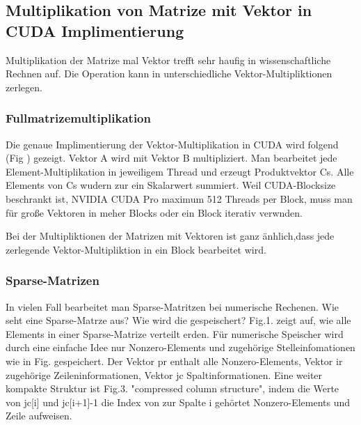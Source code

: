 



\subsection{Multiplikation von Matrize mit Vektor in CUDA Implimentierung}
Multiplikation der Matrize mal Vektor trefft sehr haufig in wissenschaftliche Rechnen auf. Die Operation kann in unterschiedliche Vektor-Multipliktionen zerlegen.

\subsubsection{Fullmatrizemultiplikation}

Die genaue Implimentierung der Vektor-Multiplikation in CUDA wird folgend (Fig ) 
gezeigt. Vektor A wird mit Vektor B multipliziert. 
Man bearbeitet jede Element-Multiplikation in jeweiligem Thread und erzeugt Produktvektor Cs.  
Alle Elements von Cs wudern zur ein Skalarwert summiert. 
Weil CUDA-Blocksize beschrankt ist, 
 NVIDIA CUDA Pro
maximum 512 Threads per Block, muss man für große Vektoren in meher Blocks oder ein Block iterativ verwnden.


Bei der Multipliktionen der Matrizen mit Vektoren ist ganz änhlich,dass jede zerlegende Vektor-Multipliktion in ein Block bearbeitet wird.




\subsubsection{Sparse-Matrizen}
In vielen Fall bearbeitet man Sparse-Matritzen bei numerische Rechenen. Wie seht eine Sparse-Matrze aus? Wie wird die gespeischert? Fig.1. zeigt auf, wie alle Elements in einer Sparse-Matrize verteilt erden. Für numerische Speischer wird durch eine einfache Idee nur Nonzero-Elements und zugehörige Stelleinfomationen wie in Fig. gespeichert. Der Vektor pr enthalt alle Nonzero-Elements, Vektor ir zugehörige Zeileninformationen, Vektor jc Spaltinformationen. Eine weiter kompakte Struktur ist Fig.3. "compressed column structure", indem die Werte von jc[i] und jc[i+1]-1 die Index von zur Spalte i gehörtet Nonzero-Elements und Zeile aufweisen.

